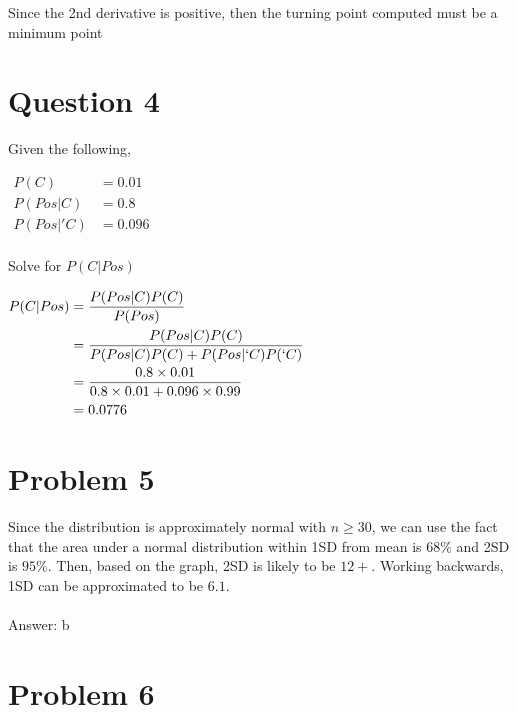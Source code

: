 \documentclass[12pt]{article}
\begin{document}
Since the 2nd derivative is positive, then the turning point computed
must be a minimum point

\newpage

\section*{Question 4}

Given the following,
\begin{center}
    $
        \begin{alignedat}{1}
            P (C)      & = 0.01  \\
            P (Pos|C)  & = 0.8   \\
            P (Pos|'C) & = 0.096 \\
        \end{alignedat}
    $
\end{center}

Solve for $P(C|Pos)$

\begin{center}
    $
        \begin{alignedat}{1}
            P(C|Pos) & = \frac{P (Pos|C) P (C)}{P (Pos)}\\
                     & =\frac{P (Pos|C) P (C)}{P (Pos|C) P (C) + P (Pos|`C) P (`C)}\\
                     & =\frac{0.8 \times0.01}{0.8 \times0.01 + 0.096 \times0.99} \\
                     & =0.0776
        \end{alignedat}
    $
\end{center}

\newpage

\section*{Problem 5}

Since the distribution is approximately normal with $n \geq 30$, we can
use the fact that the area under a normal distribution within 1SD
from mean is $68\%$ and 2SD is $95\%$. Then, based on the graph, 2SD is
likely to be $12+$. Working backwards, 1SD can be approximated to be $6.1$.
\\\\
Answer: b

\newpage

\section*{Problem 6}
\end{document}
